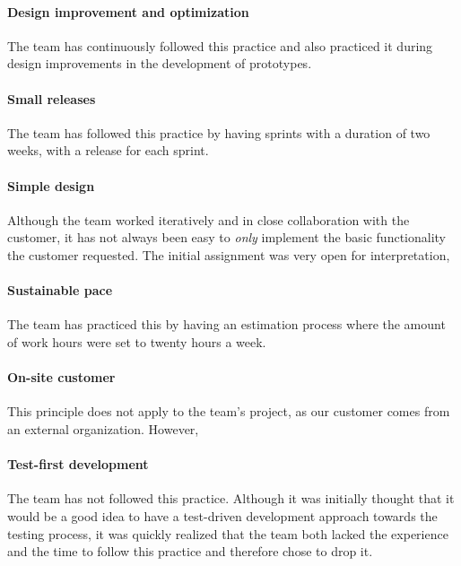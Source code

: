 \paragraph{Design improvement and optimization}
The team has continuously followed this practice and also practiced it during design improvements in the development of prototypes.
 
\paragraph{Small releases}
The team has followed this practice by having sprints with a duration of two weeks, with a release for each sprint.


\paragraph{Simple design}
Although the team worked iteratively and in close collaboration with the customer, it has not always been easy to \emph{only} implement the basic functionality the customer requested. The initial assignment was very open for interpretation,  

\paragraph{Sustainable pace}
The team has practiced this by having an estimation process where the amount of work hours were set to twenty hours a week.

\paragraph{On-site customer}
This principle does not apply to the team's project, as our customer comes from an external organization. However,

\paragraph{Test-first development}
The team has not followed this practice. Although it was initially thought that it would be a good idea to have a test-driven development approach towards the testing process, it was quickly realized that the team both lacked the experience and the time to follow this practice and therefore chose to drop it.


